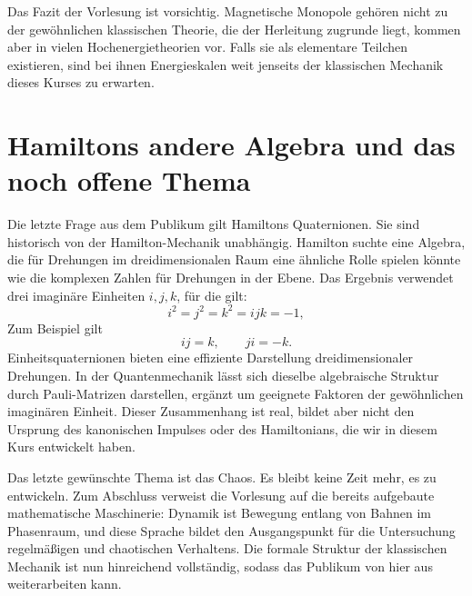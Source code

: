 \begin{classroomqa}
\end{classroomqa}

Das Fazit der Vorlesung ist vorsichtig. Magnetische Monopole gehören nicht zu der gewöhnlichen klassischen Theorie, die der Herleitung zugrunde liegt, kommen aber in vielen Hochenergietheorien vor. Falls sie als elementare Teilchen existieren, sind bei ihnen Energieskalen weit jenseits der klassischen Mechanik dieses Kurses zu erwarten.

\section{Hamiltons andere Algebra und das noch offene Thema}

Die letzte Frage aus dem Publikum gilt Hamiltons Quaternionen. Sie sind historisch von der Hamilton-Mechanik unabhängig. Hamilton suchte eine Algebra, die für Drehungen im dreidimensionalen Raum eine ähnliche Rolle spielen könnte wie die komplexen Zahlen für Drehungen in der Ebene. Das Ergebnis verwendet drei imaginäre Einheiten \(i,j,k\), für die gilt:
\begin{equation}
  i^2=j^2=k^2=ijk=-1,
\end{equation}
Zum Beispiel gilt
\begin{equation}
  ij=k,
  \qquad
  ji=-k.
\end{equation}
Einheitsquaternionen bieten eine effiziente Darstellung dreidimensionaler Drehungen. In der Quantenmechanik lässt sich dieselbe algebraische Struktur durch Pauli-Matrizen darstellen, ergänzt um geeignete Faktoren der gewöhnlichen imaginären Einheit. Dieser Zusammenhang ist real, bildet aber nicht den Ursprung des kanonischen Impulses oder des Hamiltonians, die wir in diesem Kurs entwickelt haben.

Das letzte gewünschte Thema ist das Chaos. Es bleibt keine Zeit mehr, es zu entwickeln. Zum Abschluss verweist die Vorlesung auf die bereits aufgebaute mathematische Maschinerie: Dynamik ist Bewegung entlang von Bahnen im Phasenraum, und diese Sprache bildet den Ausgangspunkt für die Untersuchung regelmäßigen und chaotischen Verhaltens. Die formale Struktur der klassischen Mechanik ist nun hinreichend vollständig, sodass das Publikum von hier aus weiterarbeiten kann.
